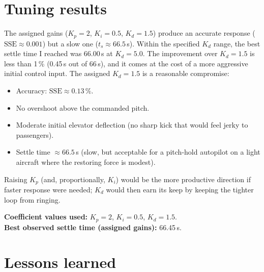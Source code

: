 \documentclass[11pt,letterpaper]{article}
\begin{document}
\section{Tuning results}

The assigned gains ($K_{p}=2$, $K_{i}=0.5$, $K_{d}=1.5$) produce an accurate
response ($\mathrm{SSE}\approx 0.001$) but a slow one
($t_{s}\approx 66.5$\,s). Within the specified $K_{d}$ range, the best
settle time I reached was 66.00\,s at $K_{d}=5.0$. The improvement over
$K_{d}=1.5$ is less than 1\,\% (0.45\,s out of 66\,s), and it comes at the
cost of a more aggressive initial control input. The assigned $K_{d}=1.5$
is a reasonable compromise:

\begin{itemize}
  \item Accuracy: $\mathrm{SSE}\approx 0.13\,\%$.
  \item No overshoot above the commanded pitch.
  \item Moderate initial elevator deflection (no sharp kick that would feel
  jerky to passengers).
  \item Settle time $\approx 66.5$\,s (slow, but acceptable for a pitch-hold
  autopilot on a light aircraft where the restoring force is modest).
\end{itemize}

Raising $K_{p}$ (and, proportionally, $K_{i}$) would be the more productive
direction if faster response were needed; $K_{d}$ would then earn its keep
by keeping the tighter loop from ringing.

\medskip
\noindent\textbf{Coefficient values used:} $K_{p}=2$, $K_{i}=0.5$, $K_{d}=1.5$.\\
\textbf{Best observed settle time (assigned gains):} 66.45\,s.

\section{Lessons learned}
\end{document}
